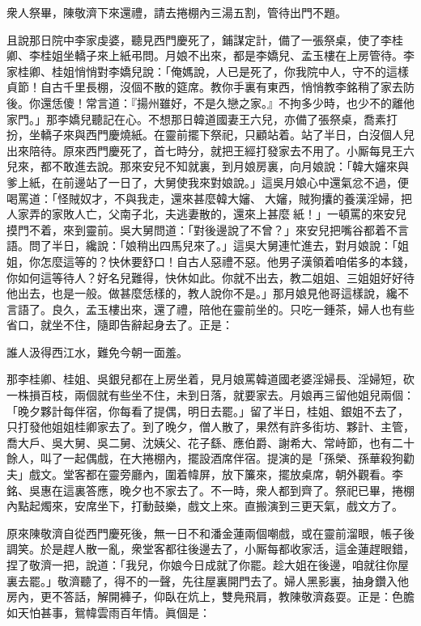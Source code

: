 衆人祭畢，陳敬濟下來還禮，請去捲棚內三湯五割，管待出門不題。

且說那日院中李家虔婆，聽見西門慶死了，鋪謀定計，{}備了一張祭桌，使了李桂卿、李桂姐坐轎子來上紙弔問。月娘不出來，都是李嬌兒、孟玉樓在上房管待。李家桂卿、桂姐悄悄對李嬌兒說：「俺媽說，人已是死了，你我院中人，守不的這樣貞節！自古千里長棚，沒個不散的筵席。教你手裏有東西，悄悄教李銘稍了家去防後。你還恁傻！常言道：『揚州雖好，不是久戀之家。』不拘多少時，也少不的離他家門。」那李嬌兒聽記在心。不想那日韓道國妻王六兒，亦備了張祭桌，喬素打扮，坐轎子來與西門慶燒紙。在靈前擺下祭祀，只顧站着。站了半日，白沒個人兒出來陪待。原來西門慶死了，首七時分，就把王經打發家去不用了。小厮每見王六兒來，都不敢進去說。那來安兒不知就裏，到月娘房裏，向月娘說：「韓大嬸來與爹上紙，在前邊站了一日了，大舅使我來對娘說。」這吳月娘心中還氣忿不過，便喝罵道：「怪賊奴才，不與我走，還來甚麼韓大嬸、𣭈大嬸，賊狗攮的養漢淫婦，把人家弄的家敗人亡，父南子北，夫逃妻散的，還來上甚麼𣭈紙！」一頓罵的來安兒摸門不着，來到靈前。吳大舅問道：「對後邊說了不曾？」來安兒把嘴谷都着不言語。問了半日，纔說：「娘稍出四馬兒來了。」這吳大舅連忙進去，對月娘說：「姐姐，你怎麼這等的？快休要舒口！自古人惡禮不惡。他男子漢領着咱偌多的本錢，你如何這等待人？好名兒難得，快休如此。你就不出去，教二姐姐、三姐姐好好待他出去，也是一般。做甚麼恁樣的，教人說你不是。」那月娘見他哥這樣說，纔不言語了。良久，孟玉樓出來，還了禮，陪他在靈前坐的。只吃一鍾茶，婦人也有些省口，就坐不住，隨即告辭起身去了。正是：

\begin{myquote}
誰人汲得西江水，難免今朝一面羞。
\end{myquote}

那李桂卿、桂姐、吳銀兒都在上房坐着，見月娘罵韓道國老婆淫婦長、淫婦短，砍一株損百枝，兩個就有些坐不住，未到日落，就要家去。月娘再三留他姐兒兩個：「晚夕夥計每伴宿，你每看了提偶，明日去罷。」留了半日，桂姐、銀姐不去了，只打發他姐姐桂卿家去了。到了晚夕，僧人散了，果然有許多街坊、夥計、主管，喬大戶、吳大舅、吳二舅、沈姨父、花子繇、應伯爵、謝希大、常峙節，也有二十餘人，叫了一起偶戲，在大捲棚內，擺設酒席伴宿。提演的是「孫榮、孫華殺狗勸夫」戲文。堂客都在靈旁廳內，圍着幃屏，放下簾來，擺放桌席，朝外觀看。李銘、吳惠在這裏答應，晚夕也不家去了。不一時，衆人都到齊了。祭祀已畢，捲棚內點起燭來，安席坐下，打動鼓樂，戲文上來。直搬演到三更天氣，戲文方了。

原來陳敬濟自從西門慶死後，無一日不和潘金蓮兩個嘲戲，或在靈前溜眼，帳子後調笑。於是趕人散一亂，衆堂客都往後邊去了，小厮每都收家活，這金蓮趕眼錯，捏了敬濟一把，說道：「我兒，你娘今日成就了你罷。趁大姐在後邊，咱就往你屋裏去罷。」敬濟聽了，得不的一聲，先往屋裏開門去了。婦人黑影裏，抽身鑽入他房內，更不答話，解開褲子，仰臥在炕上，{}雙鳧飛肩，教陳敬濟姦耍。正是：色膽如天怕甚事，鴛幃雲雨百年情。眞個是：

